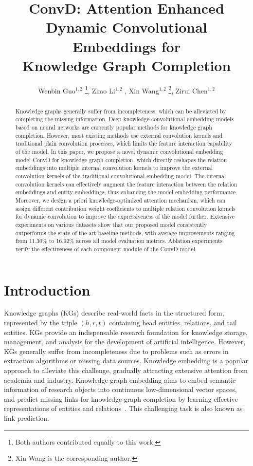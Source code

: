 \documentclass[letterpaper]{article} %
\title{ConvD: Attention Enhanced Dynamic Convolutional Embeddings for\\Knowledge Graph Completion}
\author{
Wenbin Guo$^{1,2}$ \thanks{Both authors contributed equally to this work.},
Zhao Li$^{1,2}$ \footnotemark[1],
Xin Wang$^{1,2}$ \footnote{Xin Wang is the corresponding author.},
Zirui Chen$^{1,2}$
}
\begin{document}
\maketitle

\begin{abstract}
Knowledge graphs generally suffer from incompleteness, which can be alleviated by completing the missing information. Deep knowledge convolutional embedding models based on neural networks are currently popular methods for knowledge graph completion. However, most existing methods use external convolution kernels and traditional plain convolution processes, which limits the feature interaction capability of the model. In this paper, we propose a novel dynamic convolutional embedding model ConvD for knowledge graph completion, which directly reshapes the relation embeddings into multiple internal convolution kernels to improve the external convolution kernels of the traditional convolutional embedding model. The internal convolution kernels can effectively augment the feature interaction between the relation embeddings and entity embeddings, thus enhancing the model embedding performance. Moreover, we design a priori knowledge-optimized attention mechanism, which can assign different contribution weight coefficients to multiple relation convolution kernels for dynamic convolution to improve the expressiveness of the model further. Extensive experiments on various datasets show that our proposed model consistently outperforms the state-of-the-art baseline methods, with average improvements ranging from 11.30\% to 16.92\% across all model evaluation metrics. Ablation experiments verify the effectiveness of each component module of the ConvD model. 
\end{abstract}



\section{Introduction}
Knowledge graphs (KGs) describe real-world facts in the structured form, represented by the triple $(h, r, t)$ containing head entities, relations, and tail entities. KGs provide an indispensable research foundation for knowledge storage, management, and analysis for the development of artificial intelligence. However, KGs generally suffer from incompleteness due to problems such as errors in extraction algorithms or missing data sources. Knowledge embedding is a popular approach to alleviate this challenge, gradually attracting extensive attention from academia and industry. Knowledge graph embedding aims to embed semantic information of research objects into continuous low-dimensional vector spaces, and predict missing links for knowledge graph completion by learning effective representations of entities and relations~\cite{TransO}. This challenging task is also known as link prediction.
\end{document}
